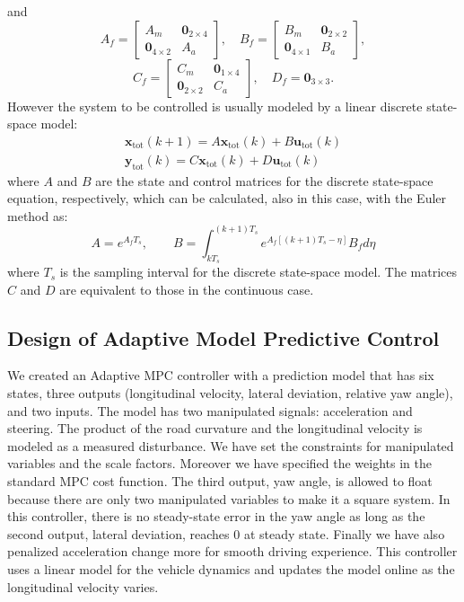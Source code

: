 \documentclass[conference, 11pt]{IEEEtran}
\begin{document}
and
\[ 
A_f=\begin{bmatrix}
A_m&\textbf{0}_{2\times4}\\
\textbf{0}_{4\times2}&A_a
\end{bmatrix},
\quad
B_f=\begin{bmatrix}
B_m&\textbf{0}_{2\times2}\\
\textbf{0}_{4\times1}&B_a
\end{bmatrix},
\]
\[
C_f=\begin{bmatrix}
C_m&\textbf{0}_{1\times4}\\
\textbf{0}_{2\times2}&C_a
\end{bmatrix}, 
\quad
D_f=\textbf{0}_{3\times3}. 
\]
However the system to be controlled is usually modeled by a linear discrete state-space model:
\begin{equation*}
\label{eqn:full_dynamics_model_disc}
\begin{array}{rr}
{\textbf{x}}_{\text{tot}}(k+1) =A \textbf{x}_{\text{tot}}(k)+ B \textbf{u}_{\text{tot}}(k)\\
\textbf{y}_{\text{tot}}(k) =C\textbf{x}_{\text{tot}}(k) + D \textbf{u}_{\text{tot}}(k)
\end{array}
\end{equation*}
where $A$ and $B$ are the state and control matrices for the discrete state-space equation, respectively, which can be calculated, also in this case, with the Euler method as:
\[
A = e^{A_fT_s},\qquad B = \int_{kT_s}^{(k+1)T_s} e^{A_f[(k+1)T_s-\eta]}B_f d\eta
\]
where $T_s$ is the sampling interval for the discrete state-space model. The matrices $C$ and $D$ are equivalent to those in the continuous case.

\subsection{Design of Adaptive Model Predictive Control}
We created an Adaptive MPC controller with a prediction model that has six states, three outputs (longitudinal velocity, lateral deviation, relative yaw angle), and two inputs. The model has two manipulated signals: acceleration and steering. The product of the road curvature and the longitudinal velocity is modeled as a measured disturbance. We have set the constraints for manipulated variables and the scale factors. Moreover we have specified the weights in the standard MPC cost function. The third output, yaw angle, is allowed to float because there are only two manipulated variables to make it a square system. In this controller, there is no steady-state error in the yaw angle as long as the second output, lateral deviation, reaches 0 at steady state. Finally we have also penalized acceleration change more for smooth driving experience. This controller uses a linear model for the vehicle dynamics and updates the model online as the longitudinal velocity varies.
\end{document}
